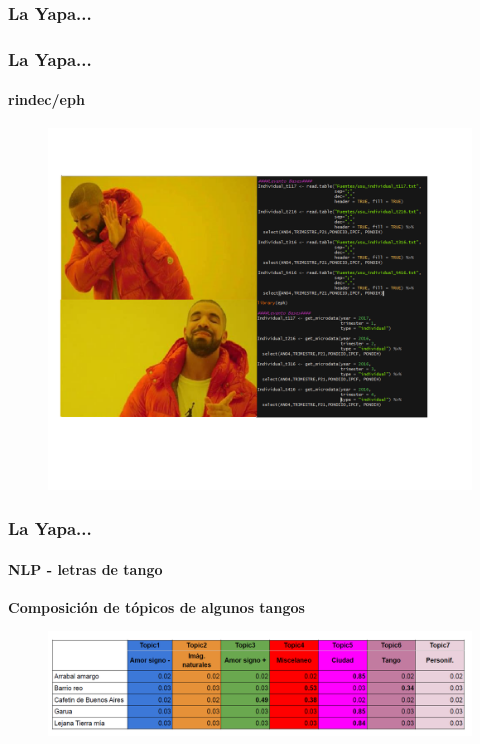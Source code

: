 \documentclass{beamer}
\begin{document}
\subsubsection{La Yapa...}
\begin{frame}
\frametitle{La Yapa... }
\framesubtitle{rindec/eph}
\begin{figure}
	\centering
	\includegraphics[width=0.8 \linewidth, height=0.7 \textheight]{../img/rindec2}
\end{figure}
\end{frame}


\begin{frame}
\frametitle{La Yapa... }
\framesubtitle{NLP - letras de tango }
\small{\textbf{Composición de tópicos de algunos tangos}}
\begin{figure}
	\centering
	\includegraphics[width=0.9 \linewidth, height=0.35 \textheight]{../img/tango1}
\end{figure}
\end{frame}
\end{document}
